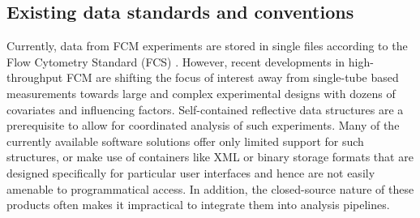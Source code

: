 \documentclass[12pt]{article}
\begin{document}
\subsection*{Existing data standards and conventions}

Currently, data from FCM experiments are stored in single files
according to the Flow Cytometry Standard (FCS) \citep{seamer1997pnd}.
However, recent developments in high-throughput FCM are shifting the
focus of interest away from single-tube based measurements towards
large and complex experimental designs with dozens of covariates and
influencing factors. Self-contained reflective data
structures are a prerequisite to allow for coordinated analysis of
such experiments.  Many of the currently available software solutions
offer only limited support for such structures, or make use of
containers like XML or binary storage formats that are designed
specifically for particular user interfaces and hence are not easily
amenable to programmatical access. In addition, the closed-source
nature of these products often makes it impractical to integrate them into
analysis pipelines.
\end{document}
